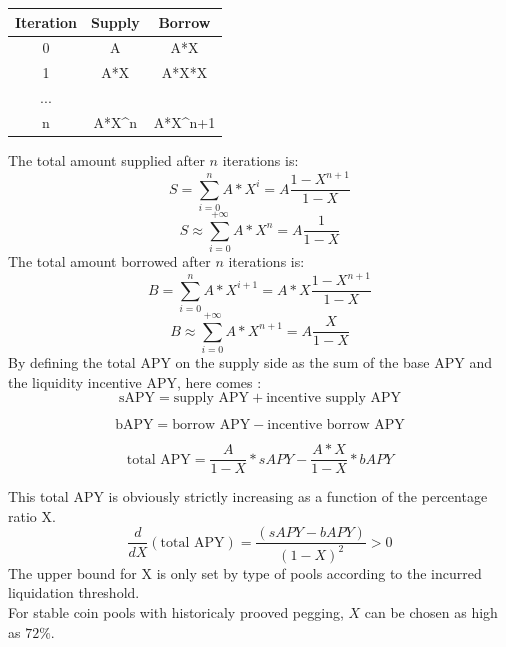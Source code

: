 \documentclass[conference]{IEEEtran}
\begin{document}
\begin{center}
\begin{tabular}{||c c c||} 
 \hline
 Iteration & Supply & Borrow \\ [0.5ex] 
 \hline\hline
 0 &  A & A*X  \\ 
 \hline
 1 &  A*X & A*X*X\\
 \hline
 ... & &  \\
 \hline
 n &  A*X^{n} & A*X^{n+1} \\
 \end{tabular}
\end{center}
The total amount supplied after $n$ iterations is:
\begin{equation}\label{eq:foldingSupply}
S = \sum\limits_{i=0}^{n} A*X^i = A\frac{1-X^{n+1}}{1-X} 
\end{equation}
$$
S \approx \sum\limits_{i=0}^{+\infty} A*X^n = A\frac{1}{1-X}
$$
The total amount borrowed after $n$ iterations is:
\begin{equation}\label{eq:foldingBorrow}
B = \sum\limits_{i=0}^{n} A*X^{i+1} = A*X\frac{1-X^{n+1}}{1-X}
\end{equation}
$$
B \approx \sum\limits_{i=0}^{+\infty} A*X^{n+1} = A\frac{X}{1-X}
$$
By defining the total APY on the supply side as the sum of the base APY and the liquidity incentive APY, here comes :
\begin{equation} \label{eq:tAPYsupply}
   \text{sAPY} = \text{supply APY} + \text{incentive supply APY} 
\end{equation}

\begin{equation}\label{eq:tAPYborrow}
  \text{bAPY} = \text{borrow APY} - \text{incentive borrow APY} 
\end{equation}

\begin{equation}
   \text{total APY} = \frac{A}{1-X} * sAPY - \frac{A*X}{1-X} * bAPY 
\end{equation}

This total APY is obviously strictly increasing as a function of the percentage ratio X.
\begin{equation}
\frac{d} {dX}\left( \text{total APY}\right) = \frac{\left(sAPY-bAPY\right)} {(1-X)^2}>0
\end{equation}
 The upper bound for X is only set by type of pools according to the incurred liquidation threshold.\\
 For stable coin pools with historicaly prooved pegging, $X$ can be chosen as high as $72\%$.
\end{document}
